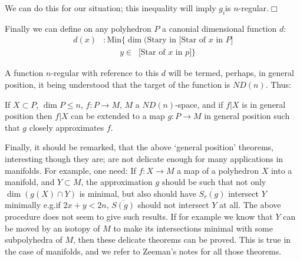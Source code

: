 We can do this for our situation; this inequality will imply $g_{i}$\pageoriginale is $n$-regular.\hfill$\Box$

Finally we can define on any polyhedron $P$ a canonial dimensional function $d$:
\begin{align*}
d(x) &: \text{Min}\Big\{\dim (\text{Stary in [Star of $x$ in $P$]}\\[4pt]
&\qquad y\in\ \text{~[Star of $x$ in $p$]}\Big\}
\end{align*}

A function $n$-regular with reference to this $d$ will be termed, perhaps, in general position, it being understood that the target of the function is $ND(n)$. Thus:

\begin{coro*}
If $X\subset P$, $\dim P\leq n$, $f:P\to M$, $M$ a $ND(n)$-space, and if $f|X$ is in general position then $f|X$ can be extended to a map $g:P\to M$ in general position such that $g$ closely approximates $f$. 
\end{coro*}

\setcounter{proposition}{17}
\begin{conclusion}
Finally, it should be remarked, that the above `general position' theorems, interesting though they are; are not delicate enough for many applications in manifolds. For example, one need: If $f:X\to M$ a map of a polyhedron $X$ into a manifold, and $Y\subset M$, the approximation $g$ should be such that not only $\dim (g(X)\cap Y)$ is minimal, but also should have $\overline{S_{r}(g)}$ intersect $Y$ minimally e.g.\@ if $2x+y<2n$, $\overline{S(g)}$ should not intersect $Y$ at all. The above procedure does not seem to give such results. If for example we know that $Y$ can be moved by an isotopy of $M$ to make its intersections minimal with some subpolyhedra of $M$, then these delicate theorems can be proved. This is true in the case of manifolds, and we refer to Zeeman's notes for all those theorems.
\end{conclusion}




